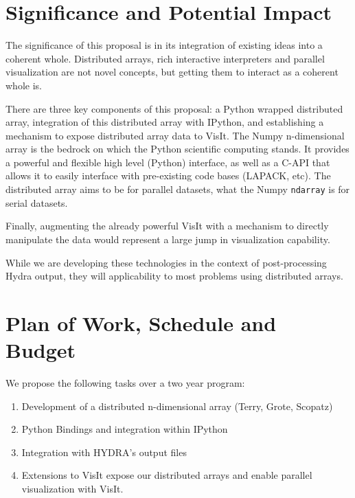 \documentclass[letterpaper,11pt]{article}
\begin{document}






\section*{Significance and Potential Impact}
The significance of this proposal is in its integration of existing ideas into a coherent whole.  Distributed arrays, rich interactive interpreters and parallel visualization are not novel concepts, but getting them to interact as a coherent whole is.

There are three key components of this proposal: a Python wrapped distributed array, integration of this distributed array with IPython, and establishing a mechanism to expose distributed array data to VisIt.  The Numpy n-dimensional array is the bedrock on which the Python scientific computing stands.  It provides a powerful and flexible high level (Python) interface, as well as a C-API that allows it to easily interface with pre-existing code bases (LAPACK, etc).  The distributed array aims to be for parallel datasets, what the Numpy \texttt{ndarray} is for serial datasets.

Finally, augmenting the already powerful VisIt with a mechanism to directly manipulate the data would represent a large jump in visualization capability.

While we are developing these technologies in the context of post-processing Hydra output, they will applicability to most problems using distributed arrays.



\section*{Plan of Work, Schedule and Budget}

We propose the following tasks over a two year program:

\begin{enumerate}
	\item Development of a distributed n-dimensional array (Terry, Grote, Scopatz)

	\item Python Bindings and integration within IPython

	\item Integration with HYDRA's output files

	\item Extensions to VisIt expose our distributed arrays and enable parallel visualization with VisIt.
\end{enumerate}
\end{document}
